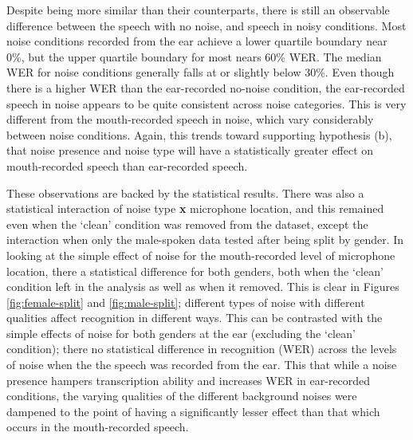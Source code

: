 
Despite being more similar than their \DIFdelbegin {}\DIFdelend \DIFaddbegin {}\DIFaddend counterparts, there is still an observable difference between the \DIFdelbegin {}\DIFdelend \DIFaddbegin {}\DIFaddend speech with no noise, and \DIFdelbegin {}\DIFdelend \DIFaddbegin {}\DIFaddend speech in noisy conditions.  Most noise conditions recorded from the ear achieve a lower quartile boundary near 0\%, but the upper quartile boundary for most nears 60\% WER.  The median WER for noise conditions generally falls at or slightly below 30\%. 
Even though there is a higher WER than the ear-recorded no-noise condition, the ear-recorded speech in noise appears to be quite consistent across noise categories.  This is very different from the mouth-recorded speech in noise, which vary considerably between noise conditions. Again, this trends toward supporting hypothesis (b), that noise presence and noise type will have a statistically greater effect on mouth-recorded speech than ear-recorded speech.

These observations are backed by the statistical results.  There was also a statistical interaction of noise type \textbf{x} microphone location, and this remained even when the `clean' condition was removed from the dataset, except the interaction \DIFdelbegin {}\DIFdelend \DIFaddbegin {}\DIFaddend when only the male-spoken data \DIFdelbegin {}\DIFdelend \DIFaddbegin {}\DIFaddend tested after being split by gender.  In looking at the simple effect of noise for the mouth-recorded level of microphone location, there \DIFdelbegin {}\DIFdelend \DIFaddbegin {}\DIFaddend a statistical difference for both genders, both when the `clean' condition \DIFdelbegin {}\DIFdelend \DIFaddbegin {}\DIFaddend left in the analysis as well as when it \DIFdelbegin {}\DIFdelend \DIFaddbegin {}\DIFaddend removed.  This is \DIFdelbegin {}\DIFdelend clear in Figures \ref{fig:female-split} and \ref{fig:male-split}\DIFdelbegin {}\DIFdelend ; different types of noise with different qualities \DIFdelbegin {}\DIFdelend affect recognition in different ways.  This can be contrasted with the simple effects of noise for both genders at the ear (excluding the `clean' condition); there \DIFdelbegin {}\DIFdelend \DIFaddbegin {}\DIFaddend no statistical difference in recognition (WER) across the levels of noise when the the speech was recorded from the ear.  This \DIFdelbegin {}\DIFdelend \DIFaddbegin {}\DIFaddend that while a noise presence hampers transcription ability and increases WER in ear-recorded conditions, the varying qualities of the different background noises were dampened to the point of having a significantly lesser effect than that which occurs in the mouth-recorded speech.

